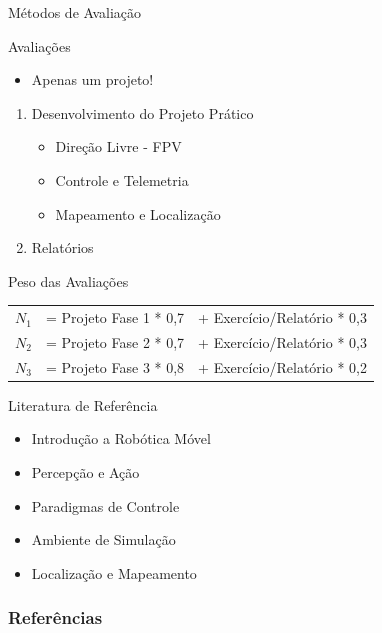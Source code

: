 \documentclass{beamer}
\begin{document}
\begin{frame}{Métodos de Avaliação}
	\begin{block}{Avaliações}
	\begin{itemize}
		\item Apenas um projeto!
	\end{itemize}
		\begin{enumerate}
			\item Desenvolvimento do Projeto Prático
				\begin{itemize}
					\item Direção Livre - FPV
					\item Controle e Telemetria
					\item Mapeamento e Localização
				\end{itemize}
			\item Relatórios
		\end{enumerate}
	\end{block}
	\begin{block}{Peso das Avaliações}
		\begin{tabular}{lll}
			\hline
			$N_1$ &= Projeto Fase 1 * 0,7&+ Exercício/Relatório * 0,3\\ 
			$N_2$ &= Projeto Fase 2 * 0,7&+ Exercício/Relatório * 0,3 \\ 
			$N_3$ &= Projeto Fase 3 * 0,8&+ Exercício/Relatório * 0,2 \\ 
			\hline
		\end{tabular}
	\end{block}
\end{frame} 


\begin{frame}{Literatura de Referência}
	\begin{itemize}
		\item Introdução a Robótica Móvel
		\item Percepção e Ação
		\item Paradigmas de Controle
		\item Ambiente de Simulação
		\item Localização e Mapeamento
	\end{itemize} 
\end{frame}

\begin{frame}[t, allowframebreaks]
	\frametitle{Referências}
	
\end{frame}
  
\end{document}
